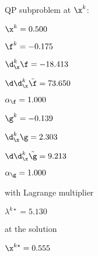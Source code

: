 QP subproblem at $\x^{k}$:

\bigskip
$\x^k=   0.500$


$\f^k =  -0.175$

$\d^k_{\x} \f = -18.413$

$\d\d^k_{\x} \tilde \f =  73.650$

$\alpha_{\footnotesize\f} =   1.000$

\bigskip
$\g^k =  -0.139$

$\d^k_{\x}\g =   2.303$

$\d\d^k_{\x} \tilde \g =   9.213$

$\alpha_{\footnotesize\g} =   1.000$

\bigskip
with Lagrange multiplier

$\lambda^{k\star} =   5.130$

at the solution

$\x^{k\star} =   0.555$


